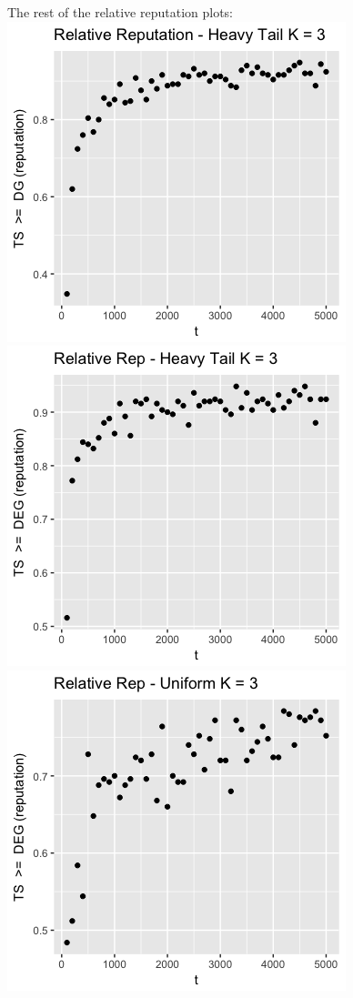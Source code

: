 \documentclass[11pt,letterpaper]{article}
\begin{document}
The rest of the relative reputation plots: \\
\includegraphics[scale=0.5]{ts_dg_ht_3_prelim} \\
\includegraphics[scale=0.5]{ts_deg_ht_3_prelim} \\
\includegraphics[scale=0.5]{ts_deg_unif_3_prelim} \\
\end{document}
